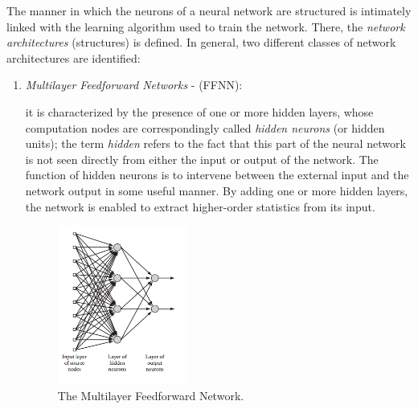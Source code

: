 The manner in which the neurons of a neural network are structured is intimately linked with the learning algorithm used to train the network. %
There, the \textit{network architectures} (structures) is defined.
In general, two different classes of network architectures are identified:
\begin{enumerate}

%
%


\item \textit{Multilayer Feedforward Networks} - (FFNN):

it is characterized by the presence of one or more hidden layers, whose computation nodes are correspondingly called \textit{hidden neurons} (or hidden units);
the term \textit{hidden} refers to the fact that this part of the neural network is not seen directly from either the input or output of the network. 
The function of hidden neurons is to intervene between the external input and the network output in some useful manner. By adding one or more hidden layers, the network is enabled to extract higher-order statistics from its input. 


\begin{figure}
\centering
\includegraphics[width=0.4\textwidth]{img/MLP}
\caption{The Multilayer Feedforward Network.}
\end{figure}



\end{enumerate}
